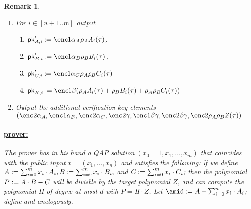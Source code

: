 \documentclass[11pt]{article}
\numberwithin{figure}{section} %
\newtheorem{remark}[thm]{Remark}
\begin{document}
\begin{remark}
\begin{enumerate}
 \begin{enumerate}
  \item $\pk_{A,i}\defeq \enc1{\rho_A A_i(\tau)}$
  
\item $\pk_{B,i}\defeq\enc2{\rho_B B_i(\tau)}$,
\item $\pk_{C,i}\defeq \enc1{\rho_A\rho_B C_i(\tau)}$,

\end{enumerate}
 \item For $i\in [n+1..m]$ output
\begin{enumerate}
\item  $\pk'_{A,i}\defeq\enc1{\alpha_A\rho_A A_i(\tau)}$,
\item $\pk'_{B,i}\defeq \enc1{\alpha_B\rho_B B_i(\tau)}$,
\item $\pk'_{C,i}\defeq \enc1{\alpha_C \rho_A\rho_B C_i(\tau)}$
\item $\pk_{K,i}\defeq \enc1{\beta(\rho_A A_i(\tau) + \rho_B B_i(\tau) + \rho_A\rho_B C_i(\tau))}$ 


\end{enumerate}



\item Output the additional verification key elements $(\enc2{\alpha_A},\enc1{\alpha_B},\enc2{\alpha_C},\enc2{\gamma},\enc1{\beta\gamma},\enc2{\beta\gamma},\enc2{\rho_A\rho_B Z(\tau)})$
 \end{enumerate}

\newcommand{\Amid}{\ensuremath{A_{\mathrm{mid}}}\xspace}
\paragraph{\underline{prover:}\\}
The prover has in his hand a QAP solution $(x_0=1,x_1,\ldots,x_m)$ that coincides with the public input $x=(x_1,\ldots,x_n)$ and satisfies the following:
If we define $A:= \sum_{i=0}^m x_i\cdot A_i, B:= \sum_{i=0}^m x_i \cdot B_i,$ and $C:= \sum_{i=0}^m x_i \cdot C_i$;
then the polynomial $P:= A\cdot B - C$ will be divisble by the target polynomial $Z$, and \per can compute the polynomial $H$ of degree at most $d$ with $P=H\cdot Z$. Let $\amid\defeq A -\sum_{i=0}^n x_i\cdot A_i$; define \bmid and \cmid analogously.


\end{remark}
\end{document}
